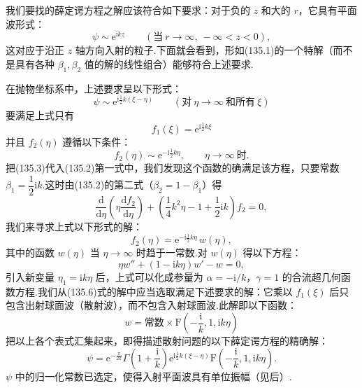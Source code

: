 我们要找的薛定谔方程之解应该符合如下要求：对于负的 $z$ 和大的 $r$，它具有平面波形式：
\begin{equation*}
  \psi\sim\mathrm{e}^{\mathrm{i}kz}
  \qquad(\text{当}\ r\to\infty,\ -\infty<z<0),
\end{equation*}
这对应于沿正 $z$ 轴方向入射的粒子.下面就会看到，形如(135.1)的一个特解（而不是具有各种 $\beta_1,\beta_2$ 值的解的线性组合）能够符合上述要求.

在抛物坐标系中，上述要求呈以下形式：
\begin{equation*}
  \psi\sim\mathrm{e}^{\mathrm{i}\frac{1}{2}k(\xi-\eta)}
  \qquad(\text{对}\ \eta\to\infty\ \text{和所有}\ \xi)
\end{equation*}
要满足上式只有
\begin{equation}
  f_1(\xi)=\mathrm{e}^{\mathrm{i}\frac{1}{2}k\xi}
\end{equation}
并且 $f_2(\eta)$ 遵循以下条件：
\begin{equation}
  f_2(\eta)\sim\mathrm{e}^{-\mathrm{i}\frac{1}{2}k\eta},
  \qquad\eta\to\infty\ \text{时}.
\end{equation}
把(135.3)代入(135.2)第一式中，我们发现这个函数的确满足该方程，只要常数 $\beta_1=\dfrac{1}{2}\mathrm{i}k$.这时由(135.2)的第二式（$\beta_2=1-\beta_1$）得
\begin{equation*}
  \frac{\mathrm{d}}{\mathrm{d}\eta}
  \left(\eta\frac{\mathrm{d}f_2}{\mathrm{d}\eta}\right)
  +\left(\frac{1}{4}k^2\eta-1+\frac{1}{2}\mathrm{i}k\right)f_2=0,
\end{equation*}
我们来寻求上式以下形式的解：
\begin{equation}
  f_2(\eta)=\mathrm{e}^{-\mathrm{i}\frac{1}{2}k\eta}\,w(\eta),
\end{equation}
其中的函数 $w(\eta)$ 当 $\eta\to\infty$ 时趋于一常数.对 $w(\eta)$ 得以下方程：
\begin{equation}
  \eta w''+(1-\mathrm{i}k\eta)w'-w=0,
\end{equation}
引入新变量 $\eta_1=\mathrm{i}k\eta$ 后，上式可以化成参量为
$\alpha=-\mathrm{i}/k$，$\gamma=1$ 的合流超几何函数方程.我们从(135.6)式的解中应当选取满足下述要求的解：它乘以 $f_1(\xi)$ 后只包含出射球面波（散射波），而不包含入射球面波.此解即以下函数：
\begin{equation*}
  w=\text{常数}\times\mathrm{F}
  \left(-\frac{\mathrm{i}}{k},1,\mathrm{i}k\eta\right)
\end{equation*}
把以上各个表式汇集起来，即得描述散射问题的以下薛定谔方程的精确解：
\begin{equation}
  \psi=\mathrm{e}^{-\frac{\pi}{2k}}
  \Gamma\left(1+\frac{\mathrm{i}}{k}\right)
  \mathrm{e}^{\mathrm{i}\frac{1}{2}k(\xi-\eta)}
  \mathrm{F}\left(-\frac{\mathrm{i}}{k},1,\mathrm{i}k\eta\right).
\end{equation}
$\psi$ 中的归一化常数已选定，使得入射平面波具有单位振幅（见后）.

